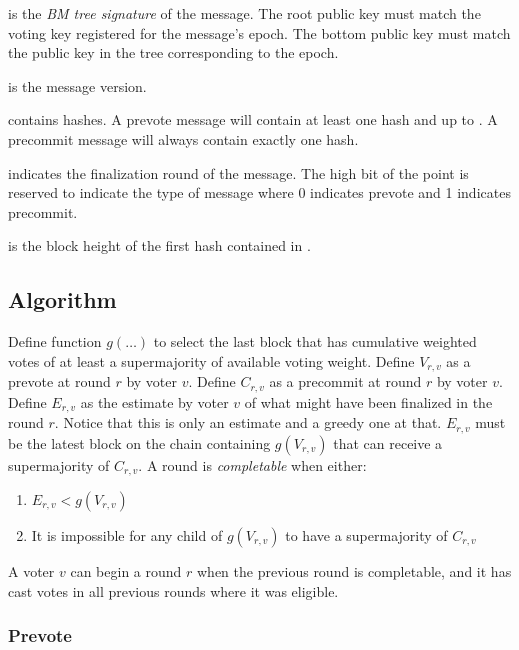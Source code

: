  is the \emph{BM tree signature}  of the message.
The root public key must match the voting key registered for the message's epoch.
The bottom public key must match the public key in the tree corresponding to the epoch.

 is the message version.

 contains  hashes.
A prevote message will contain at least one hash and up to .
A precommit message will always contain exactly one hash.

 indicates the finalization round of the message.
The high bit of the point is reserved to indicate the type of message where 0 indicates prevote and 1 indicates precommit.

 is the block height of the first hash contained in .

\subsection{Algorithm}
\label{sec:finalization:algorithm}

Define function $g(\ldots)$ to select the last block that has cumulative weighted votes of at least a supermajority of available voting weight.
Define $V_{r,v}$ as a prevote at round $r$ by voter $v$.
Define $C_{r,v}$ as a precommit at round $r$ by voter $v$.
Define $E_{r,v}$ as the estimate by voter $v$ of what might have been finalized in the round $r$.
Notice that this is only an estimate and a greedy one at that.
$E_{r,v}$ must be the latest block on the chain containing $g(V_{r,v})$ that can receive a supermajority of $C_{r,v}$.
A round is \emph{completable} when either:
\begin{enumerate}
	\item{$E_{r,v} < g(V_{r,v})$}
	\item{It is impossible for any child of $g(V_{r,v})$ to have a supermajority of $C_{r,v}$}
\end{enumerate}

A voter $v$ can begin a round $r$ when the previous round is completable, and it has cast votes in all previous rounds where it was eligible.

\subsubsection{Prevote}

